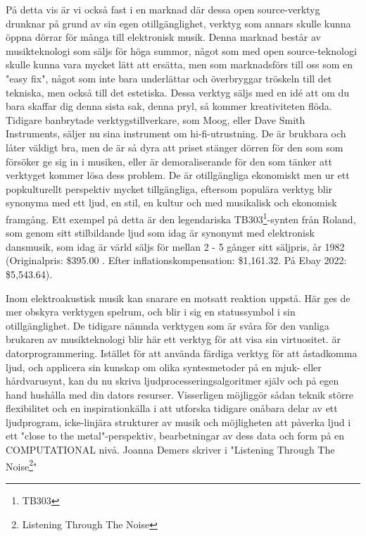 \documentclass{article}
\begin{document}
På detta vis är vi också fast i en marknad där dessa open source-verktyg drunknar på grund av sin egen
otillgänglighet, verktyg som annars skulle kunna öppna dörrar för många till elektronisk musik. Denna
marknad består av musikteknologi som säljs för höga summor, något som med open source-teknologi skulle kunna
vara mycket lätt att ersätta, men som marknadsförs till oss som en "easy fix", något som inte bara
underlättar och överbryggar tröskeln till det tekniska, men också till det estetiska. Dessa verktyg
säljs med en idé att om du bara skaffar dig denna sista sak, denna pryl, så kommer kreativiteten flöda.
Tidigare banbrytade verktygstillverkare, som Moog, eller Dave Smith Instruments, säljer nu sina instrument
om hi-fi-utrustning. De är brukbara och låter väldigt bra, men de är så dyra att priset stänger dörren för
den som som försöker ge sig in i musiken, eller är demoraliserande för den som tänker att verktyget kommer
lösa dess problem. De är otillgängliga ekonomiskt men ur ett popkulturellt perspektiv mycket tillgängliga,
eftersom populära verktyg blir synonyma med ett ljud, en stil, en kultur och med musikalisk och ekonomisk
framgång. Ett exempel på detta är den legendariska TB303\footnote{TB303}-synten från Roland, som genom sitt
stilbildande ljud som idag är synonymt med elektronisk dansmusik, som idag är värld säljs för mellan 2 - 5
gånger sitt säljpris, år 1982 (Originalpris: \$395.00 . Efter inflationskompensation: \$1,161.32. På Ebay
2022: \$5,543.64).



Inom elektroakustisk musik kan snarare en motsatt reaktion uppstå. Här ges de mer obskyra verktygen spelrum,
och blir i sig en statussymbol i sin otillgänglighet. De tidigare nämnda verktygen som är svåra för den
vanliga brukaren av musikteknologi blir här ett verktyg för att visa sin virtuositet. 
är datorprogrammering. 
Istället för att använda färdiga verktyg för att åstadkomma ljud, och applicera sin kunskap om olika
syntesmetoder på en mjuk- eller hårdvarusynt, kan du nu skriva ljudprocesseringsalgoritmer själv och på egen
hand hushålla med din dators resurser. Visserligen möjliggör sådan teknik större flexibilitet och en
inspirationkälla i att utforska tidigare onåbara delar av ett ljudprogram, icke-linjära strukturer av musik
och möjligheten att påverka ljud i ett "close to the metal"-perspektiv, bearbetningar av dess data och form
på en COMPUTATIONAL nivå.
Joanna Demers skriver i "Listening Through The Noise\footnote{Listening Through The Noise}"
\end{document}

